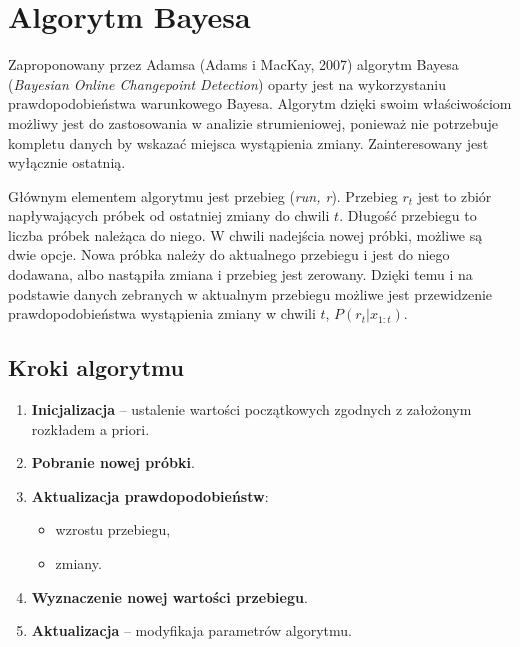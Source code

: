 \section{Algorytm Bayesa}
\label{sec:Bayes}
Zaproponowany przez Adamsa (Adams i MacKay, 2007) algorytm Bayesa (\textit{Bayesian Online Changepoint Detection})
oparty jest na wykorzystaniu prawdopodobieństwa warunkowego Bayesa.
Algorytm dzięki swoim właściwościom możliwy jest do zastosowania w analizie strumieniowej,
ponieważ nie potrzebuje kompletu danych by wskazać miejsca wystąpienia zmiany.
Zainteresowany jest wyłącznie ostatnią.

Głównym elementem algorytmu jest przebieg (\textit{run, r}).
Przebieg $r_t$ jest to zbiór napływających próbek od ostatniej zmiany do chwili $t$.
Długość przebiegu to liczba próbek należąca do niego.
W chwili nadejścia nowej próbki,
możliwe są dwie opcje.
Nowa próbka należy do aktualnego przebiegu i jest do niego dodawana,
albo nastąpiła zmiana i przebieg jest zerowany.
Dzięki temu i na podstawie danych zebranych w aktualnym przebiegu
możliwe jest przewidzenie prawdopodobieństwa wystąpienia zmiany w chwili $t$,
$P(r_t|x_{1:t})$.

\subsection*{Kroki algorytmu}
\begin{enumerate}
  \item \textbf{Inicjalizacja} -- ustalenie wartości początkowych zgodnych z założonym rozkładem a priori.
  \item \textbf{Pobranie nowej próbki}.
  \item \textbf{Aktualizacja prawdopodobieństw}:
    \begin{itemize}
      \item wzrostu przebiegu,
      \item zmiany.
    \end{itemize}
  \item \textbf{Wyznaczenie nowej wartości przebiegu}.
  \item \textbf{Aktualizacja} -- modyfikaja parametrów algorytmu.
\end{enumerate}
